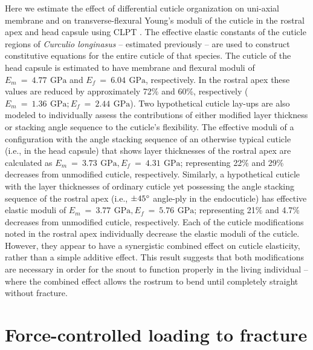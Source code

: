 \documentclass[twocolumn, linenumbers, superscriptaddress, nofootinbib]{revtex4-1}
\begin{document}
		Here we estimate the effect of differential cuticle organization on uni-axial membrane and on transverse-flexural Young's moduli of the cuticle in the rostral apex and head capsule using CLPT \cite{Reddy2004, Jones2014}.
		The effective elastic constants of the cuticle regions of \textit{Curculio longinasus} -- estimated previously \cite{Jansen2016} -- are used to construct constitutive equations for the entire cuticle of that species.
		The cuticle of the head capsule is estimated to have membrane and flexural moduli of $E_m~=~4.77~\,\text{GPa}$ and $E_f~=~6.04~\,\text{GPa}$, respectively.
		In the rostral apex these values are reduced by approximately 72\% and 60\%, respectively ($E_m~=~1.36~\,\text{GPa}; E_f~=~2.44~\,\text{GPa}$).
		Two hypothetical cuticle lay-ups are also modeled to individually assess the contributions of either modified layer thickness or stacking angle sequence to the cuticle's flexibility.
		The effective moduli of a configuration with the angle stacking sequence of an otherwise typical cuticle (i.e., in the head capsule) that shows layer thicknesses of the rostral apex are calculated as $E_m~=~3.73~\,\text{GPa}, E_f~=~4.31~\,\text{GPa}$; representing 22\% and 29\% decreases from unmodified cuticle, respectively.
		Similarly, a hypothetical cuticle with the layer thicknesses of ordinary cuticle yet possessing the angle stacking sequence of the rostral apex (i.e., $\pm45\degree$ angle-ply in the endocuticle) has effective elastic moduli of $E_m~=~3.77~\,\text{GPa}, E_f~=~5.76~\,\text{GPa}$; representing 21\% and 4.7\% decreases from unmodified cuticle, respectively.
		Each of the cuticle modifications noted in the rostral apex individually decrease the elastic moduli of the cuticle.
		However, they appear to have a synergistic combined effect on cuticle elasticity, rather than a simple additive effect.
		This result suggests that both modifications are necessary in order for the snout to function properly in the living individual -- where the combined effect allows the rostrum to bend until completely straight without fracture.
	
	\section{Force-controlled loading to fracture}
		
\end{document}
